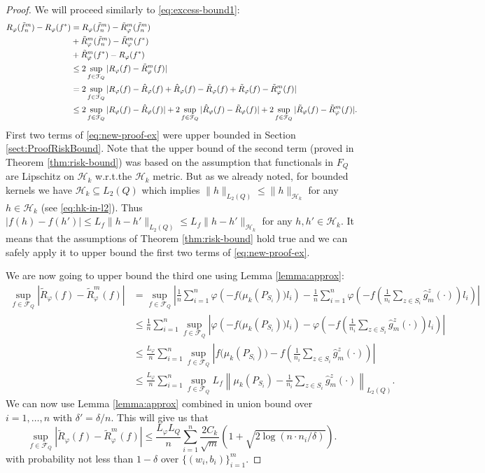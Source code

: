\documentclass{article}
\renewcommand{\H}{\mathcal{H}}
\newcommand{\F}{\mathcal{F}}
\newcommand{\Rp}{R_{\varphi}}
\newcommand{\Rpn}{\hat{R}_{\varphi}}
\newcommand{\Rpnt}{\tilde{R}_{\varphi}}
\newcommand{\f}{f^*}
\newcommand{\fnt}{\tilde{f}_n}
\begin{document}
\begin{proof}
We will proceed similarly to \eqref{eq:excess-bound1}:
\begin{align}
\notag
\Rp(\fnt^m) - \Rp(\f)
&=
\Rp(\fnt^m) - \Rpnt^m(\fnt^m)\\
\notag
&+
\Rpnt^m(\fnt^m) -\Rpnt^m(\f)\\
\notag
&+
\Rpnt^m(\f) - \Rp(\f)\\
\notag
&\leq
2\sup_{f\in \F_Q}|\Rp(f) - \Rpnt^m(f)|\\
\notag
&=
2\sup_{f\in \F_Q}|\Rp(f) - \Rpn(f) + \Rpn(f) - \Rpnt(f) + \Rpnt(f) - \Rpnt^m(f)|\\
&\leq
\label{eq:new-proof-ex}
2\sup_{f\in \F_Q}|\Rp(f) - \Rpn(f)|
+
2\sup_{f\in \F_Q}|\Rpn(f) - \Rpnt(f)|
+
2\sup_{f\in \F_Q}|\Rpnt(f) - \Rpnt^m(f)|.
\end{align}
First two terms of \eqref{eq:new-proof-ex} were upper bounded in Section \ref{sect:ProofRiskBound}.
Note that the upper bound of the second term (proved in Theorem \ref{thm:risk-bound}) was based on the assumption that functionals in $F_Q$ are Lipschitz on $\H_k$ w.r.t.\:the $\H_k$ metric.
But as we already noted, for bounded kernels we have $\H_k\subseteq L_2(Q)$ which implies $\|h\|_{L_2(Q)}\leq \|h\|_{\H_k}$ for any $h\in\H_k$ (see \eqref{eq:hk-in-l2}). Thus $|f(h) - f(h')| \leq L_f \|h - h'\|_{L_2(Q)}\leq L_f \|h - h'\|_{\H_k}$ for any $h,h'\in \H_k$.
It means that the assumptions of Theorem \ref{thm:risk-bound} hold true and we can safely apply it to upper bound the first two terms of \eqref{eq:new-proof-ex}.

We are now going to upper bound the third one using Lemma \ref{lemma:approx}:
\begin{align*}
\sup_{f\in \F_Q}|\Rpnt(f) - \Rpnt^m(f)|&=
\sup_{f\in \F_Q}\left| \frac{1}{n}\sum_{i=1}^n \varphi\left(-f\bigl(\mu_k(P_{S_i})\bigr)l_i\right) - 
\frac{1}{n}\sum_{i=1}^n\varphi\left(-f\left(\frac{1}{n_i}\sum_{z\in S_i}\hat{g}_m^{z}(\cdot)\right)l_i\right)\right|\\
&\leq
\frac{1}{n}\sum_{i=1}^n\sup_{f\in \F_Q}\left| \varphi\left(-f\bigl(\mu_k(P_{S_i})\bigr)l_i\right) - 
\varphi\left(-f\left(\frac{1}{n_i}\sum_{z\in S_i}\hat{g}_m^{z}(\cdot)\right)l_i\right)\right|\\
&\leq
\frac{L_{\varphi}}{n}\sum_{i=1}^n\sup_{f\in \F_Q}\left| f\bigl(\mu_k(P_{S_i})\bigr) - 
f\left(\frac{1}{n_i}\sum_{z\in S_i}\hat{g}_m^{z}(\cdot)\right)\right|\\
&\leq
\frac{L_{\varphi}}{n}\sum_{i=1}^n\sup_{f\in \F_Q}L_f
\left\| \mu_k(P_{S_i}) - \frac{1}{n_i}\sum_{z\in S_i}\hat{g}_m^{z}(\cdot)\right\|_{L_2(Q)}.
\end{align*}
We can now use Lemma \ref{lemma:approx} combined in union bound over $i=1,\dots,n$ with $\delta' = \delta/n$.
This will give us that
\[
\sup_{f\in \F_Q}|\Rpnt(f) - \Rpnt^m(f)|
\leq
\frac{L_{\varphi}L_Q}{n}\sum_{i=1}^n
\frac{2C_k}{\sqrt{m}}\left(1 + \sqrt{{2\log(n\cdot n_i/\delta)}}\right).
\]
with probability not less than $1-\delta$ over $\{(w_i,b_i)\}_{i=1}^m$.
\end{proof}
\end{document}
